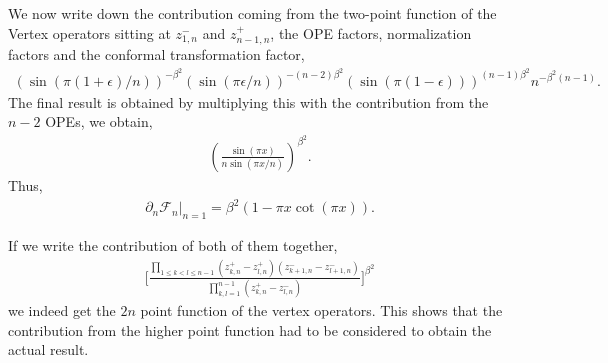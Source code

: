 \documentclass[11pt]{article}
\newcommand{\ep}{\epsilon}
\newcommand{\p}{\partial}
\newcommand{\lb}{\left(}
\newcommand{\rb}{\right)}
\begin{document}
We now write down the contribution coming from the two-point function of the Vertex operators sitting at $z_{1,n}^-$ and $z_{n-1,n}^+$, the OPE factors, normalization factors and the conformal transformation factor,
\begin{align}
    \lb\sin(\pi(1+\ep)/n)\rb^{-\beta^2} \lb \sin(\pi \ep/n) \rb^{-(n-2)\beta^2}(\sin(\pi(1-\ep)))^{(n-1)\beta^2} n^{-\beta^2(n-1)}.
\end{align}
The final result is obtained by multiplying this with the contribution from the $n-2$ OPEs, we obtain,
\begin{align}
    \lb\frac{\sin(\pi x)}{n\sin(\pi x/n)}\rb^{\beta^2}.
\end{align}
Thus,
\begin{align}
    \p_n\mathcal{F}_n|_{n=1} = \beta^2 (1-\pi x\cot(\pi x)).
\end{align}


If we write the contribution of both of them together,
\begin{align}
    \Bigg[\frac{\prod_{1\leq k < l \leq n-1}(z_{k,n}^+ - z_{l,n}^+)(z_{k+1,n}^- - z_{l+1,n}^-)}{\prod_{k,l=1}^{n-1}(z_{k,n}^+ - z_{l,n}^-)}\Bigg]^{\beta^2}
\end{align}
we indeed get the $2n$ point function of the vertex operators. This shows that the contribution from the higher point function had to be considered to obtain the actual result.

\end{document}
